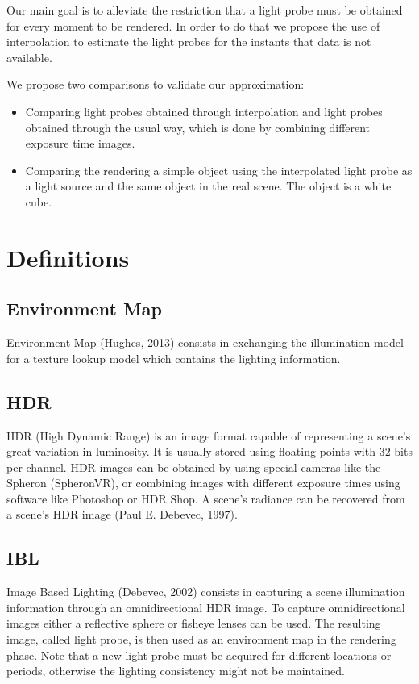\documentclass[conference]{acmsiggraph}
\begin{document}
	Our main goal is to alleviate the restriction that a light probe must be obtained for every moment to be rendered. In order to do that we propose the use of interpolation to estimate the light probes for the instants that data is not available.

	We propose two comparisons to validate our approximation:
	\begin{itemize}
		\item Comparing light probes obtained through interpolation and light probes obtained through the usual way, which is done by combining different exposure time images.
		\item Comparing the rendering a simple object using the interpolated light probe as a light source and the same object in the real scene. The object is a white cube.
	\end{itemize}




\section{Definitions}

	\subsection{Environment Map}

		Environment Map (Hughes, 2013) consists in exchanging the illumination model for a texture lookup model which contains the lighting information.

	\subsection{HDR}

		HDR (High Dynamic Range) is an image format capable of representing a scene’s great variation in luminosity. It is usually stored using floating points with 32 bits per channel. HDR images can be obtained by using special cameras like the Spheron (SpheronVR), or combining images with different exposure times using software like Photoshop or HDR Shop. A scene’s radiance can be recovered from a scene’s HDR image (Paul E. Debevec, 1997).

	\subsection{IBL}

		Image Based Lighting (Debevec, 2002) consists in capturing a scene illumination information through an omnidirectional HDR image. To capture omnidirectional images either a reflective sphere or fisheye lenses can be used. The resulting image, called light probe, is then used as an environment map in the rendering phase. Note that a new light probe must be acquired for different locations or periods, otherwise the lighting consistency might not be maintained.
\end{document}
